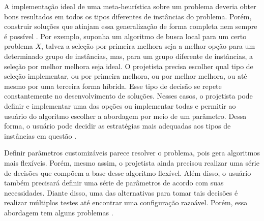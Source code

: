 
A implementação ideal de uma meta-heurística sobre um problema deveria obter bons resultados em todos os tipos diferentes de instâncias do problema. Porém, construir soluções que atinjam essa generalização de forma completa nem sempre é possível \citep{birattari2009tuning}. Por exemplo, suponha um algoritmo de busca local para um certo problema $X$, talvez a seleção por primeira melhora seja a melhor opção para um determinado grupo de instâncias, mas, para um grupo diferente de instâncias, a seleção por melhor melhora seja ideal. O projetista precisa escolher qual tipo de seleção implementar, ou por primeira melhora, ou por melhor melhora, ou até mesmo por uma terceira forma híbrida. Esse tipo de decisão se repete constantemente no desenvolvimento de soluções. Nesses casos, o projetista pode definir e implementar uma das opções ou implementar todas e permitir ao usuário do algoritmo escolher a abordagem por meio de um parâmetro. Dessa forma, o usuário pode decidir as estratégias mais adequadas aos tipos de instâncias em questão \citep{birattari2009tuning}.

Definir parâmetros customizáveis parece resolver o problema, pois gera algoritmos mais flexíveis. Porém, mesmo assim, o projetista ainda precisou realizar uma série de decisões que compõem a base desse algoritmo flexível. Além disso, o usuário também precisará definir uma série de parâmetros de acordo com suas necessidades. Diante disso, uma das alternativas para tomar tais decisões é realizar múltiplos testes até encontrar uma configuração razoável. Porém, essa abordagem tem alguns problemas \citep{birattari2009tuning}.

